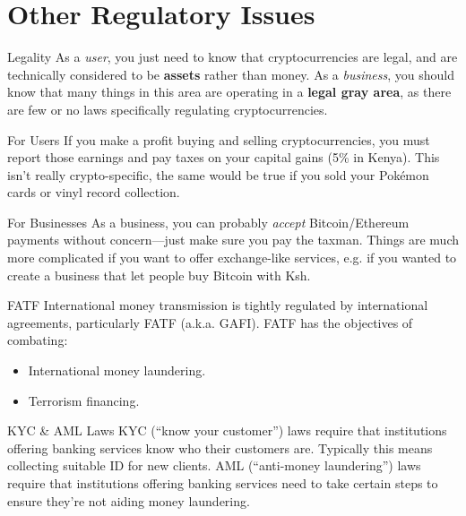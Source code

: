 \documentclass[14pt]{beamer}
\begin{document}
\section{Other Regulatory Issues}

\begin{frame}{Legality}
  As a \emph{user}, you just need to know that cryptocurrencies are legal, and
  are technically considered to be \textbf{assets} rather than money.
  \newline
  \newline
  As a \emph{business}, you should know that many things in this area are
  operating in a \textbf{legal gray area}, as there are few or no laws
  specifically regulating cryptocurrencies.
\end{frame}

\begin{frame}{For Users}
  If you make a profit buying and selling cryptocurrencies, you must report
  those earnings and pay taxes on your capital gains (5\% in Kenya).
  \newline
  \newline
  This isn't really crypto-specific, the same would be true if you sold your
  Pok\'{e}mon cards or vinyl record collection.
\end{frame}

\begin{frame}{For Businesses}
  As a business, you can probably \emph{accept} Bitcoin/Ethereum payments
  without concern---just make sure you pay the taxman.
  \newline
  \newline
  Things are much more complicated if you want to offer exchange-like services,
  e.g. if you wanted to create a business that let people buy Bitcoin with Ksh.
\end{frame}

\begin{frame}{FATF}
  International money transmission is tightly regulated by international
  agreements, particularly FATF (a.k.a. GAFI).
  \newline
  \newline
  FATF has the objectives of combating:
  \begin{itemize}
    \item International money laundering.
    \item Terrorism financing.
  \end{itemize}
\end{frame}

\begin{frame}{KYC \& AML Laws}
  KYC (``know your customer'') laws require that institutions offering banking
  services know who their customers are. Typically this means collecting
  suitable ID for new clients.
  \newline
  \newline
  AML (``anti-money laundering'') laws require that institutions offering
  banking services need to take certain steps to ensure they're not aiding money
  laundering.
\end{frame}
\end{document}
